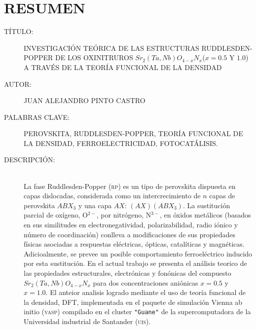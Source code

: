 \chapter*{RESUMEN}

\footnotesize{
\begin{description}
  \item[TÍTULO:] INVESTIGACIÓN TEÓRICA DE LAS ESTRUCTURAS RUDDLESDEN-POPPER DE LOS OXINITRUROS $Sr_{2}(Ta,Nb)O_{4-x}N_{x}$($x=0.5$ Y $1.0$) A TRAVÉS DE LA TEORÍA FUNCIONAL DE LA DENSIDAD
  \item[AUTOR:] JUAN ALEJANDRO PINTO CASTRO
  \item[PALABRAS CLAVE:] PEROVSKITA, RUDDLESDEN-POPPER, TEORÍA FUNCIONAL DE LA DENSIDAD, FERROELECTRICIDAD, FOTOCATÁLISIS.
  \item[DESCRIPCIÓN:]\hfill \\ La fase Ruddlesden-Popper (\textsc{rp}) es un tipo de perovskita dispuesta en capas dislocadas, considerada como un intercrecimiento de $n$ capas de perovskita $ABX_{3}$ y una capa $AX$: $(AX)(ABX_{3})$. 
  La sustitución parcial de oxígeno, O$^{2-}$, por nitrógeno, N$^{3-}$, en óxidos metálicos (basados en sus similitudes en electronegatividad, polarizabilidad, radio iónico y número de coordinación) conlleva a  modificaciones de sus propiedades físicas asociadas a respuestas eléctricas, ópticas, catalíticas y magnéticas. Adicioalmente, se prevee un posible comportamiento ferroeléctrico inducido por esta sustitución. 
  En el actual trabajo se presenta el análisis teorico de las propiedades estructurales, electrónicas y fonónicas del compuesto $Sr_{2}(Ta,Nb)O_{4-x}N_{x}$ para dos concentraciones aniónicas $x=0.5$ y $x=1.0$. El anteior analisis logrado mediante el uso de teoría funcional de la densidad, DFT, implementada en el paquete de simulación Vienna ab initio (\textsc{vasp}) compilado en el cluster \texttt{"Guane"} de la supercomputadora de la Universidad industrial de Santander (\textsc{uis}).
  

\end{description}}
